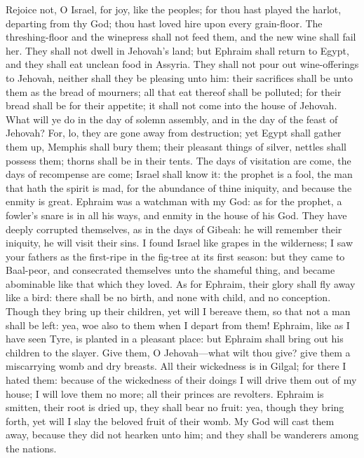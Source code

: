 Rejoice not, O Israel, for joy, like the peoples; for thou hast played the harlot, departing from thy God; thou hast loved hire upon every grain-floor. The threshing-floor and the winepress shall not feed them, and the new wine shall fail her. They shall not dwell in Jehovah’s land; but Ephraim shall return to Egypt, and they shall eat unclean food in Assyria. They shall not pour out wine-offerings to Jehovah, neither shall they be pleasing unto him: their sacrifices shall be unto them as the bread of mourners; all that eat thereof shall be polluted; for their bread shall be for their appetite; it shall not come into the house of Jehovah. What will ye do in the day of solemn assembly, and in the day of the feast of Jehovah? For, lo, they are gone away from destruction; yet Egypt shall gather them up, Memphis shall bury them; their pleasant things of silver, nettles shall possess them; thorns shall be in their tents. The days of visitation are come, the days of recompense are come; Israel shall know it: the prophet is a fool, the man that hath the spirit is mad, for the abundance of thine iniquity, and because the enmity is great. Ephraim was a watchman with my God: as for the prophet, a fowler’s snare is in all his ways, and enmity in the house of his God. They have deeply corrupted themselves, as in the days of Gibeah: he will remember their iniquity, he will visit their sins.  I found Israel like grapes in the wilderness; I saw your fathers as the first-ripe in the fig-tree at its first season: but they came to Baal-peor, and consecrated themselves unto the shameful thing, and became abominable like that which they loved. As for Ephraim, their glory shall fly away like a bird: there shall be no birth, and none with child, and no conception. Though they bring up their children, yet will I bereave them, so that not a man shall be left: yea, woe also to them when I depart from them! Ephraim, like as I have seen Tyre, is planted in a pleasant place: but Ephraim shall bring out his children to the slayer. Give them, O Jehovah—what wilt thou give? give them a miscarrying womb and dry breasts. All their wickedness is in Gilgal; for there I hated them: because of the wickedness of their doings I will drive them out of my house; I will love them no more; all their princes are revolters. Ephraim is smitten, their root is dried up, they shall bear no fruit: yea, though they bring forth, yet will I slay the beloved fruit of their womb. My God will cast them away, because they did not hearken unto him; and they shall be wanderers among the nations. 

